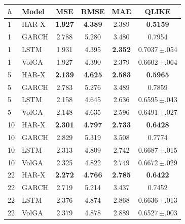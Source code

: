 \begin{tabular}{llcccc}
\toprule
$h$ & Model & MSE & RMSE & MAE & QLIKE \\
\midrule
1 & HAR-X & \textbf{1.927} & \textbf{4.389} & 2.389 & \textbf{0.5159} \\
1 & GARCH & 2.788 & 5.280 & 3.480 & 0.7954 \\
1 & LSTM & 1.931 & 4.395 & \textbf{2.352} & 0.7037\,$\pm$.054 \\
1 & VolGA & 1.927 & 4.390 & 2.379 & 0.6602\,$\pm$.064 \\
\midrule
5 & HAR-X & \textbf{2.139} & \textbf{4.625} & \textbf{2.583} & \textbf{0.5965} \\
5 & GARCH & 2.783 & 5.276 & 3.489 & 0.7859 \\
5 & LSTM & 2.158 & 4.645 & 2.636 & 0.6595\,$\pm$.043 \\
5 & VolGA & 2.148 & 4.635 & 2.596 & 0.6491\,$\pm$.027 \\
\midrule
10 & HAR-X & \textbf{2.301} & \textbf{4.797} & \textbf{2.733} & \textbf{0.6428} \\
10 & GARCH & 2.829 & 5.319 & 3.508 & 0.7774 \\
10 & LSTM & 2.313 & 4.809 & 2.742 & 0.6687\,$\pm$.015 \\
10 & VolGA & 2.325 & 4.822 & 2.749 & 0.6672\,$\pm$.029 \\
\midrule
22 & HAR-X & \textbf{2.272} & \textbf{4.766} & \textbf{2.785} & \textbf{0.6422} \\
22 & GARCH & 2.719 & 5.214 & 3.437 & 0.7452 \\
22 & LSTM & 2.376 & 4.874 & 2.868 & 0.6636\,$\pm$.013 \\
22 & VolGA & 2.379 & 4.878 & 2.889 & 0.6527\,$\pm$.003 \\
\bottomrule
\end{tabular}
